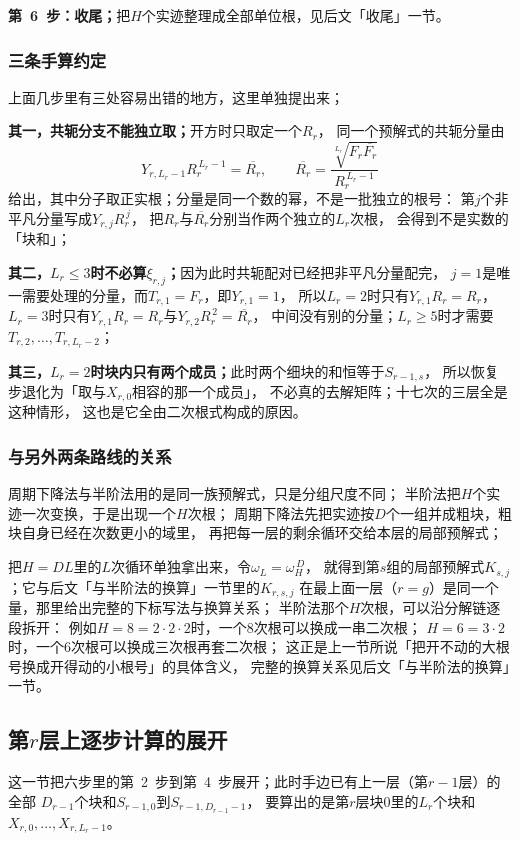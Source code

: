 \documentclass[UTF8,a4paper,11pt]{ctexart}
\begin{document}
\textbf{第~6~步：收尾；}把$H$个实迹整理成全部单位根，见后文「收尾」一节。\par

\subsubsection{三条手算约定}
上面几步里有三处容易出错的地方，这里单独提出来；

\textbf{其一，共轭分支不能独立取；}开方时只取定一个$R_r$，
同一个预解式的共轭分量由
\[
 Y_{r,L_r-1}R_r^{\,L_r-1}=\overline{R_r},
 \qquad
 \overline{R_r}=\frac{\sqrt[L_r]{F_r\overline{F_r}}}{R_r^{\,L_r-1}}
\]
给出，其中分子取正实根；分量是同一个数的幂，不是一批独立的根号：
第$j$个非平凡分量写成$Y_{r,j}R_r^{\,j}$，
把$R_r$与$\overline{R_r}$分别当作两个独立的$L_r$次根，
会得到不是实数的「块和」；\par

\textbf{其二，$L_r\le3$时不必算$\xi_{r,j}$；}因为此时共轭配对已经把非平凡分量配完，
$j=1$是唯一需要处理的分量，而$T_{r,1}=F_r$，即$Y_{r,1}=1$，
所以$L_r=2$时只有$Y_{r,1}R_r=R_r$，
$L_r=3$时只有$Y_{r,1}R_r=R_r$与$Y_{r,2}R_r^{\,2}=\overline{R_r}$，
中间没有别的分量；$L_r\ge5$时才需要$T_{r,2},\dots,T_{r,L_r-2}$；\par

\textbf{其三，$L_r=2$时块内只有两个成员；}此时两个细块的和恒等于$S_{r-1,s}$，
所以恢复步退化为「取与$X_{r,0}$相容的那一个成员」，
不必真的去解矩阵；十七次的三层全是这种情形，
这也是它全由二次根式构成的原因。\par

\subsubsection{与另外两条路线的关系}
周期下降法与半阶法用的是同一族预解式，只是分组尺度不同；
半阶法把$H$个实迹一次变换，于是出现一个$H$次根；
周期下降法先把实迹按$D$个一组并成粗块，粗块自身已经在次数更小的域里，
再把每一层的剩余循环交给本层的局部预解式；

把$H=DL$里的$L$次循环单独拿出来，令$\omega_L=\omega_H^{\,D}$，
就得到第$s$组的局部预解式$K_{s,j}$；它与后文「与半阶法的换算」一节里的$K_{r,s,j}$
在最上面一层（$r=g$）是同一个量，那里给出完整的下标写法与换算关系；
半阶法那个$H$次根，可以沿分解链逐段拆开：
例如$H=8=2\cdot2\cdot2$时，一个$8$次根可以换成一串二次根；
$H=6=3\cdot2$时，一个$6$次根可以换成三次根再套二次根；
这正是上一节所说「把开不动的大根号换成开得动的小根号」的具体含义，
完整的换算关系见后文「与半阶法的换算」一节。
\subsection{第$r$层上逐步计算的展开}
这一节把六步里的第~2~步到第~4~步展开；此时手边已有上一层（第$r-1$层）的全部
$D_{r-1}$个块和$S_{r-1,0}$到$S_{r-1,D_{r-1}-1}$，
要算出的是第$r$层块$0$里的$L_r$个块和$X_{r,0},\dots,X_{r,L_r-1}$。\par
\end{document}
